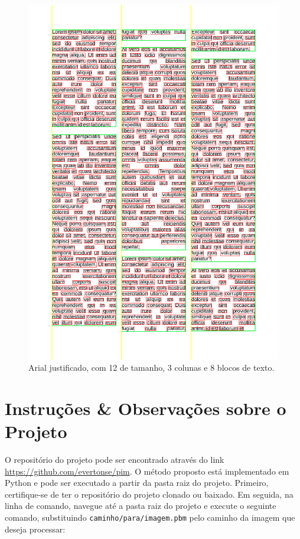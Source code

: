 \documentclass[english, 
               brazil, 
               bsc] %
               {dcomp-abntex2}
\begin{document}
\begin{figure}[H]
        \caption{\label{arial} \small Arial justificado, com 12 de tamanho, 3 colunas e 8 blocos de texto.}
        \begin{center}
            \includegraphics[scale=0.25]{./images/arial_justificado_tamanho_12_colunas_3_blocos_8_linhas_52_palavras_557.png}
        \end{center}
\end{figure}


\chapter{Instruções \& Observações sobre o Projeto}
\label{ch-notas}

O repositório do projeto pode ser encontrado através do link \url{https://github.com/evertonse/pim}. O método proposto está implementado em Python e pode ser executado a partir da pasta raiz do projeto. Primeiro, certifique-se de ter o repositório do projeto clonado ou baixado. Em seguida, na linha de comando, navegue até a pasta raiz do projeto e execute o seguinte comando, substituindo \texttt{caminho/para/imagem.pbm} pelo caminho da imagem que deseja processar:
\end{document}
